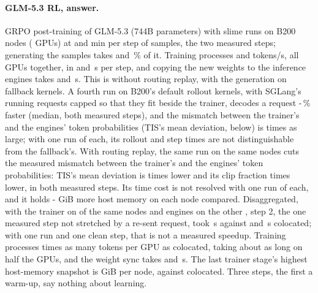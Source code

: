 \paragraph{GLM-5.3 RL, answer.} GRPO post-training of GLM-5.3 (744B parameters) with slime runs on \TriGrNodes{} B200 nodes (\TriGrGpus{} GPUs) at \TriGrStepMinOne{} and \TriGrStepMinTwo{} min per step of \TriGrSamples{} samples, the two measured steps; generating the samples takes \TriGrRolloutPctOne{} and \TriGrRolloutPctTwo\,\% of it. Training processes \TriGrTrainTokOne{} and \TriGrTrainTokTwo{} tokens/s, all \TriGrGpus{} GPUs together, in \TriGrTrainOne{} and \TriGrTrainTwo\,s per step, and copying the new weights to the inference engines takes \TriGrSyncOne{} and \TriGrSyncTwo\,s. This is without routing replay, with the generation on fallback kernels. A fourth run on B200's default rollout kernels, with SGLang's running requests capped so that they fit beside the trainer, decodes a request \TriGrKnDecodeGainOne-\TriGrKnDecodeGainTwo\,\% faster (median, both measured steps), and the mismatch between the trainer's and the engines' token probabilities (TIS's mean deviation, below) is \TriGrKnTisRatioOne{} times as large; with one run of each, its rollout and step times are not distinguishable from the fallback's. With routing replay, the same run on the same nodes cuts the measured mismatch between the trainer's and the engines' token probabilities: TIS's mean deviation is \TriGrRpTisRatioOne{} times lower and its clip fraction \TriGrRpClipRatioOne{} times lower, in both measured steps. Its time cost is not resolved with one run of each, and it holds \TriGrRpHostLo-\TriGrRpHostHi{} GiB more host memory on each node compared. Disaggregated, with the trainer on \TriGrDgTrainerNodes{} of the same nodes and \TriGrDgEngines{} engines on the other \TriGrDgEngineNodes, step 2, the one measured step not stretched by a re-sent request, took \TriGrDgStepTwo\,s against \TriGrStepOne{} and \TriGrStepTwo\,s colocated; with one run and one clean step, that is not a measured speedup. Training processes \TriGrDgTrainPerGpu{} times as many tokens per GPU as colocated, taking about as long on half the GPUs, and the weight sync takes \TriGrDgSyncOne{} and \TriGrDgSyncTwo\,s. The last trainer stage's highest host-memory snapshot is \TriGrDgHostLastHi{} GiB per node, against \TriGrHostLastHi{} colocated. Three steps, the first a warm-up, say nothing about learning.

